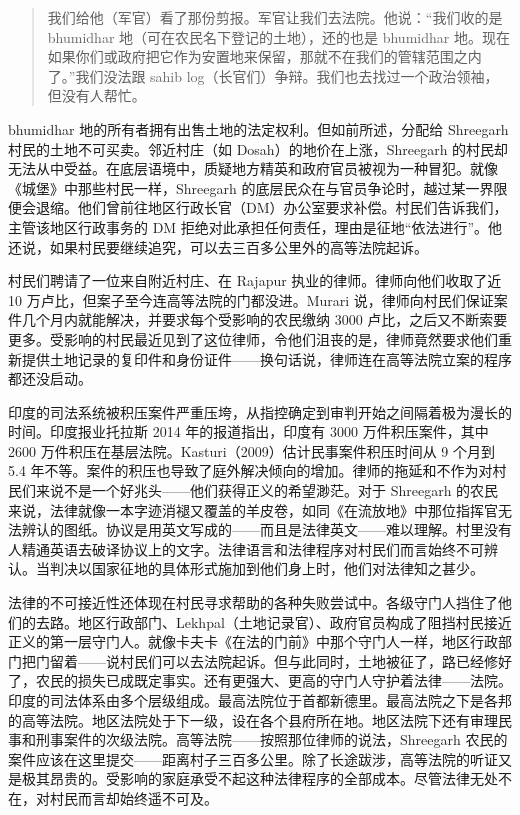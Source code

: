 \documentclass[12pt,a4paper]{article}
\begin{document}
\begin{quotation}\kaifont\noindent 我们给他（军官）看了那份剪报。军官让我们去法院。他说：“我们收的是 bhumidhar 地（可在农民名下登记的土地），还的也是 bhumidhar 地。现在如果你们或政府把它作为安置地来保留，那就不在我们的管辖范围之内了。”我们没法跟 sahib log（长官们）争辩。我们也去找过一个政治领袖，但没有人帮忙。\end{quotation}



bhumidhar 地的所有者拥有出售土地的法定权利。但如前所述，分配给 Shreegarh 村民的土地不可买卖。邻近村庄（如 Dosah）的地价在上涨，Shreegarh 的村民却无法从中受益。在底层语境中，质疑地方精英和政府官员被视为一种冒犯。就像《城堡》中那些村民一样，Shreegarh 的底层民众在与官员争论时，越过某一界限便会退缩。他们曾前往地区行政长官（DM）办公室要求补偿。村民们告诉我们，主管该地区行政事务的 DM 拒绝对此承担任何责任，理由是征地“依法进行”。他还说，如果村民要继续追究，可以去三百多公里外的高等法院起诉。



村民们聘请了一位来自附近村庄、在 Rajapur 执业的律师。律师向他们收取了近 10 万卢比，但案子至今连高等法院的门都没进。Murari 说，律师向村民们保证案件几个月内就能解决，并要求每个受影响的农民缴纳 3000 卢比，之后又不断索要更多。受影响的村民最近见到了这位律师，令他们沮丧的是，律师竟然要求他们重新提供土地记录的复印件和身份证件——换句话说，律师连在高等法院立案的程序都还没启动。



印度的司法系统被积压案件严重压垮，从指控确定到审判开始之间隔着极为漫长的时间。印度报业托拉斯 2014 年的报道指出，印度有 3000 万件积压案件，其中 2600 万件积压在基层法院。Kasturi（2009）估计民事案件积压时间从 9 个月到 5.4 年不等。案件的积压也导致了庭外解决倾向的增加。律师的拖延和不作为对村民们来说不是一个好兆头——他们获得正义的希望渺茫。对于 Shreegarh 的农民来说，法律就像一本字迹消褪又覆盖的羊皮卷，如同《在流放地》中那位指挥官无法辨认的图纸。协议是用英文写成的——而且是法律英文——难以理解。村里没有人精通英语去破译协议上的文字。法律语言和法律程序对村民们而言始终不可辨认。当判决以国家征地的具体形式施加到他们身上时，他们对法律知之甚少。



法律的不可接近性还体现在村民寻求帮助的各种失败尝试中。各级守门人挡住了他们的去路。地区行政部门、Lekhpal（土地记录官）、政府官员构成了阻挡村民接近正义的第一层守门人。就像卡夫卡《在法的门前》中那个守门人一样，地区行政部门把门留着——说村民们可以去法院起诉。但与此同时，土地被征了，路已经修好了，农民的损失已成既定事实。还有更强大、更高的守门人守护着法律——法院。印度的司法体系由多个层级组成。最高法院位于首都新德里。最高法院之下是各邦的高等法院。地区法院处于下一级，设在各个县府所在地。地区法院下还有审理民事和刑事案件的次级法院。高等法院——按照那位律师的说法，Shreegarh 农民的案件应该在这里提交——距离村子三百多公里。除了长途跋涉，高等法院的听证又是极其昂贵的。受影响的家庭承受不起这种法律程序的全部成本。尽管法律无处不在，对村民而言却始终遥不可及。
\end{document}
